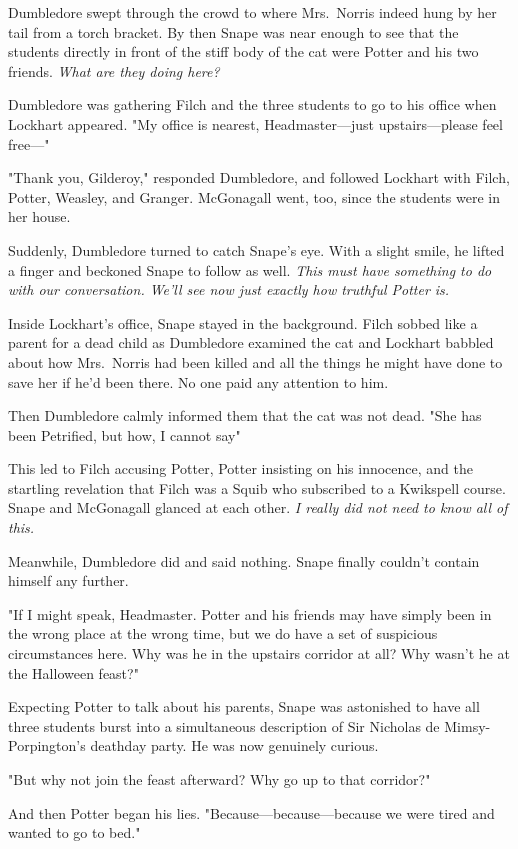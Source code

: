Dumbledore swept through the crowd to where Mrs.~Norris indeed hung by her tail from a torch bracket. By then Snape was near enough to see that the students directly in front of the stiff body of the cat were Potter and his two friends. \emph{What are they doing here?}

Dumbledore was gathering Filch and the three students to go to his office when Lockhart appeared. "My office is nearest, Headmaster—just upstairs—please feel free—"

"Thank you, Gilderoy," responded Dumbledore, and followed Lockhart with Filch, Potter, Weasley, and Granger. McGonagall went, too, since the students were in her house.

Suddenly, Dumbledore turned to catch Snape's eye. With a slight smile, he lifted a finger and beckoned Snape to follow as well. \emph{This must have something to do with our conversation. We'll see now just exactly how truthful Potter is.}

Inside Lockhart's office, Snape stayed in the background. Filch sobbed like a parent for a dead child as Dumbledore examined the cat and Lockhart babbled about how Mrs.~Norris had been killed and all the things he might have done to save her if he'd been there. No one paid any attention to him.

Then Dumbledore calmly informed them that the cat was not dead. "She has been Petrified, but how, I cannot say{\el}"

This led to Filch accusing Potter, Potter insisting on his innocence, and the startling revelation that Filch was a Squib who subscribed to a Kwikspell course. Snape and McGonagall glanced at each other. \emph{I really did not need to know all of this.}

Meanwhile, Dumbledore did and said nothing. Snape finally couldn't contain himself any further.

"If I might speak, Headmaster. Potter and his friends may have simply been in the wrong place at the wrong time, but we do have a set of suspicious circumstances here. Why was he in the upstairs corridor at all? Why wasn't he at the Halloween feast?"

Expecting Potter to talk about his parents, Snape was astonished to have all three students burst into a simultaneous description of Sir Nicholas de Mimsy-Porpington's deathday party. He was now genuinely curious.

"But why not join the feast afterward? Why go up to that corridor?"

And then Potter began his lies. "Because—because—because we were tired and wanted to go to bed."

